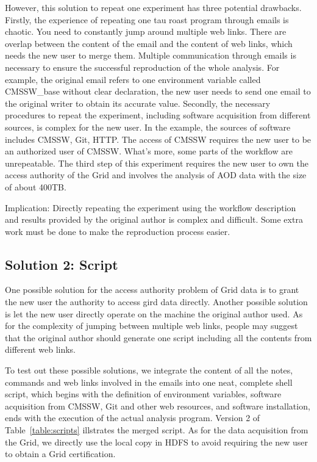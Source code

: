 \documentclass{sig-alternate}
\begin{document}
However, this solution to repeat one experiment has three potential drawbacks.
Firstly, the experience of repeating one tau roast program through emails is
chaotic. You need to constantly jump around multiple web links. There are overlap
between the content of the email and the content of web links, which needs the
new user to merge them. Multiple communication through emails is necessary to
ensure the successful reproduction of the whole analysis. For example, the original
email refers to one environment variable called CMSSW\_base without clear
declaration, the new user needs to send one email to the original writer to
obtain its accurate value. Secondly, the necessary procedures to repeat the
experiment, including software acquisition from different sources, is complex
for the new user. In the example, the sources of software includes
CMSSW, Git, HTTP. The access of CMSSW requires the new user to be an authorized
user of CMSSW. What's more, some parts of the workflow are unrepeatable. The
third step of this experiment requires the new user to own the access authority
of the Grid and involves the analysis of AOD data with the size of about 400TB.

Implication: Directly repeating the experiment using the workflow description and results provided by the original author is complex and difficult. Some extra work must be done to make the reproduction process easier.

\subsection{Solution 2: Script} One possible solution for the access authority
problem of Grid data is to grant the new user the authority to access gird data
directly. Another possible solution is let the new user directly operate on the
machine the original author used. As for the complexity of jumping between
multiple web links, people may suggest that the original author
should generate one script including all the contents from different web links.

To test out these possible solutions, we integrate the content of all the notes, commands and web links involved in the emails into one neat, complete shell script, which begins with the definition of environment variables, software acquisition from CMSSW, Git and other web resources, and software installation, ends with the execution of the actual analysis program. Version 2 of Table~\ref{table:scripts} illstrates the merged script. As for the data acquisition from the Grid, we directly use the local copy in HDFS to avoid requiring the new user to obtain a Grid certification.
\end{document}
